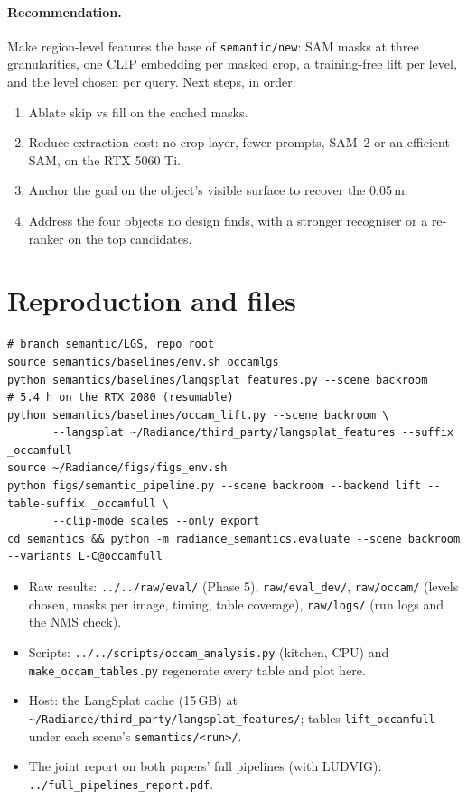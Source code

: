 \documentclass[11pt,a4paper]{article}
\newcommand{\code}[1]{\texttt{\small #1}}
\begin{document}
\paragraph{Recommendation.} Make region-level features the base of \code{semantic/new}: SAM masks at three
granularities, one CLIP embedding per masked crop, a training-free lift per level, and the level chosen per query. Next
steps, in order:
\begin{enumerate}[leftmargin=*,itemsep=1pt]
  \item Ablate skip vs fill on the cached masks.
  \item Reduce extraction cost: no crop layer, fewer prompts, SAM~2 or an efficient SAM, on the RTX 5060 Ti.
  \item Anchor the goal on the object's visible surface to recover the 0.05\,m.
  \item Address the four objects no design finds, with a stronger recogniser or a re-ranker on the top candidates.
\end{enumerate}

\section{Reproduction and files}
{\scriptsize
\begin{verbatim}
# branch semantic/LGS, repo root
source semantics/baselines/env.sh occamlgs
python semantics/baselines/langsplat_features.py --scene backroom          # 5.4 h on the RTX 2080 (resumable)
python semantics/baselines/occam_lift.py --scene backroom \
       --langsplat ~/Radiance/third_party/langsplat_features --suffix _occamfull
source ~/Radiance/figs/figs_env.sh
python figs/semantic_pipeline.py --scene backroom --backend lift --table-suffix _occamfull \
       --clip-mode scales --only export
cd semantics && python -m radiance_semantics.evaluate --scene backroom --variants L-C@occamfull
\end{verbatim}
}
\begin{itemize}[leftmargin=*,itemsep=1pt]
  \item Raw results: \code{../../raw/eval/} (Phase 5), \code{raw/eval\_dev/}, \code{raw/occam/} (levels chosen, masks per
        image, timing, table coverage), \code{raw/logs/} (run logs and the NMS check).
  \item Scripts: \code{../../scripts/occam\_analysis.py} (kitchen, CPU) and \code{make\_occam\_tables.py} regenerate every
        table and plot here.
  \item Host: the LangSplat cache (15\,GB) at \code{\textasciitilde/Radiance/third\_party/langsplat\_features/}; tables
        \code{lift\_occamfull} under each scene's \code{semantics/<run>/}.
  \item The joint report on both papers' full pipelines (with LUDVIG): \code{../full\_pipelines\_report.pdf}.
\end{itemize}
\end{document}
